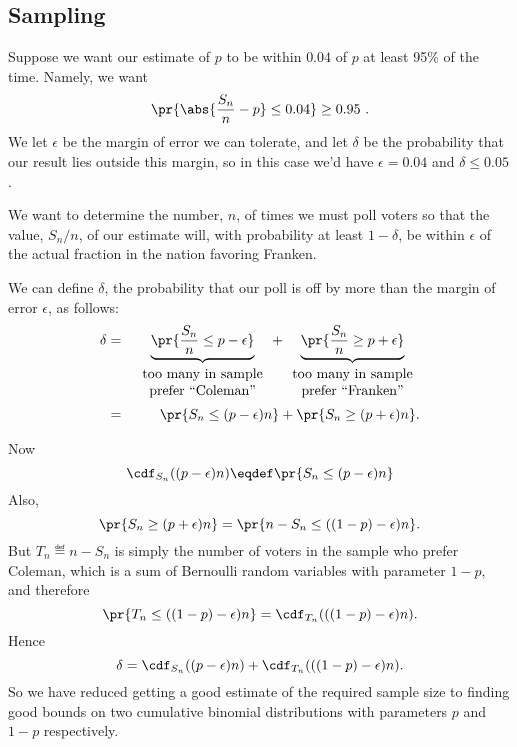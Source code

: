 \subsection{Sampling}
Suppose we want our estimate of $p$ to be within $0.04$
of $p$ at least 95\% of the time.  Namely, we want
\[
\pr{\abs{\frac{S_n}{n} - p} \leq 0.04} \geq 0.95\ .
\]
We let $\epsilon$ be the margin of error we can tolerate, and let $\delta$
be the probability that our result lies outside this margin, so in this
case we'd have $\epsilon = 0.04$ and $\delta \le 0.05$.

We want to determine the number, $n$, of times we must poll voters so that
the value, $S_n/n$, of our estimate will, with probability at least
$1 -\delta$, be within $\epsilon$ of the actual fraction in the nation
favoring Franken.

We can define $\delta$, the probability that our poll is off by more
than the margin of error $\epsilon$, as follows:
\begin{eqnarray*}
\delta  & = &
        \underbrace{\pr{\frac{S_n}{n} \leq p - \epsilon}}_{
\begin{array}{c}
\mbox{too many in sample} \\
\mbox{prefer ``Coleman''}
\end{array}}
        + \underbrace{\pr{\frac{S_n}{n} \geq p + \epsilon}}_{
\begin{array}{c}
\mbox{too many in sample} \\
\mbox{prefer ``Franken''}
\end{array}} \\
        & = & \pr{S_n \leq (p - \epsilon) n} + \pr{S_n \geq (p + \epsilon) n}.
\end{eqnarray*}

Now
\[
\cdf_{S_n}((p-\epsilon)n) \eqdef \pr{S_n \leq (p - \epsilon) n}
\]
Also,
\[
\pr{S_n \geq (p + \epsilon) n} = \pr{n- S_n \leq ((1-p) - \epsilon)n}.
\]
But $T_n \eqdef n - S_n$ is simply the number of voters in the sample who prefer
Coleman, which is a sum of Bernoulli random variables
with parameter $1-p$, and therefore
\[
\pr{T_n \leq ((1-p) - \epsilon)n} = \cdf_{T_n}(((1-p) - \epsilon)n).
\]
Hence
\begin{equation}\label{LN12:Fnpe}
\delta = \cdf_{S_n}((p - \epsilon) n) + \cdf_{T_n}(((1-p) - \epsilon) n).
\end{equation}
So we have reduced getting a good estimate of the required sample size to
finding good bounds on two cumulative binomial distributions
with parameters $p$ and $1-p$ respectively.

